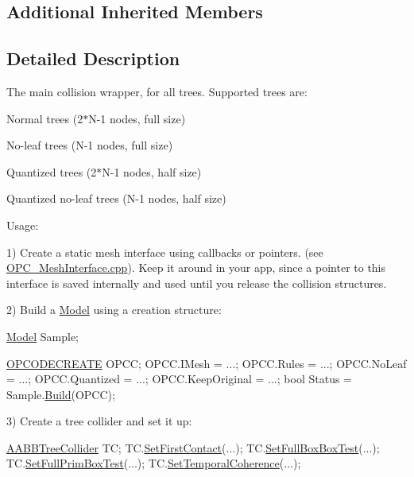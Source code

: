 \subsection*{Additional Inherited Members}


\subsection{Detailed Description}
The main collision wrapper, for all trees. Supported trees are\+:
\begin{DoxyItemize}
\item Normal trees (2$\ast$\+N-\/1 nodes, full size)
\item No-\/leaf trees (N-\/1 nodes, full size)
\item Quantized trees (2$\ast$\+N-\/1 nodes, half size)
\item Quantized no-\/leaf trees (N-\/1 nodes, half size)
\end{DoxyItemize}

Usage\+:

1) Create a static mesh interface using callbacks or pointers. (see \hyperlink{OPC__MeshInterface_8cpp}{O\+P\+C\+\_\+\+Mesh\+Interface.\+cpp}). Keep it around in your app, since a pointer to this interface is saved internally and used until you release the collision structures.

2) Build a \hyperlink{classModel}{Model} using a creation structure\+:


\begin{DoxyCode}
\hyperlink{classModel}{Model} Sample;

\hyperlink{structOPCODECREATE}{OPCODECREATE} OPCC;
OPCC.IMesh          = ...;
OPCC.Rules          = ...;
OPCC.NoLeaf         = ...;
OPCC.Quantized      = ...;
OPCC.KeepOriginal   = ...;
\textcolor{keywordtype}{bool} Status = Sample.\hyperlink{classBaseModel_ab2692ac2ec9c0c8c452d73f3a0bd341b}{Build}(OPCC);
\end{DoxyCode}


3) Create a tree collider and set it up\+:


\begin{DoxyCode}
\hyperlink{classAABBTreeCollider}{AABBTreeCollider} TC;
TC.\hyperlink{classCollider_a106bfa35e6d203dfdb27a291b9fab01a}{SetFirstContact}(...);
TC.\hyperlink{classAABBTreeCollider_af9ae98fa5e9b721069a0dd4122754deb}{SetFullBoxBoxTest}(...);
TC.\hyperlink{classAABBTreeCollider_a4aa21d13a55b5874783b227f95ae967f}{SetFullPrimBoxTest}(...);
TC.\hyperlink{classCollider_a66fdf6157bf0159578723f3ed66f6e3f}{SetTemporalCoherence}(...);
\end{DoxyCode}


